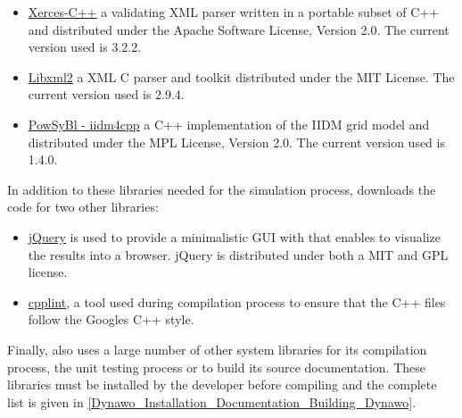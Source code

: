 \documentclass[a4paper, 12pt]{report}
\begin{document}
\begin{itemize}
\item \href{http://xerces.apache.org/xerces-c/}{\underline{Xerces-C++}} a validating XML parser written in a portable subset of C++ and distributed under the Apache Software License, Version 2.0. The current version used is 3.2.2.

\item \href{http://xmlsoft.org/}{\underline{Libxml2}} a XML C parser and toolkit distributed under the MIT License. The current version used is 2.9.4.

\item \href{https://www.powsybl.org/pages/documentation/developer/repositories/powsybl-iidm4cpp.html}{\underline{PowSyBl - iidm4cpp}} a C++ implementation of the IIDM grid model and distributed under the MPL License, Version 2.0. The current version used is 1.4.0.

\end{itemize}

In addition to these libraries needed for the simulation process, \Dynawo downloads the code for two other libraries:
\begin{itemize}
\item \href{https://jquery.com/}{\underline{jQuery}} is used to provide a minimalistic GUI with \Dynawo that enables to visualize the results into a browser. jQuery is distributed under both a MIT and GPL license.
\item \href{https://github.com/google/styleguide/tree/gh-pages/cpplint}{\underline{cpplint}}, a tool used during \Dynawo compilation process to ensure that the C++ files follow the Google\textquotesingle s C++ style.
\end{itemize}

Finally, \Dynawo also uses a large number of other system libraries for its compilation process, the unit testing process or to build its source documentation. These libraries must be installed by the developer before compiling \Dynawo and the complete list is given in \ref{Dynawo_Installation_Documentation_Building_Dynawo}.



\end{document}
